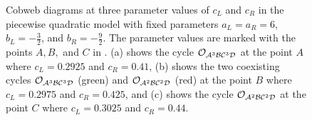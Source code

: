 \begin{figure}
	\centering
	\caption[Cobweb diagrams of the even quadratic model]{
		Cobweb diagrams at three parameter values of $c_L$ and $c_R$ in the piecewise quadratic model with fixed parameters $a_L = a_R = 6$, $b_L = -\frac{3}{2}$, and $b_R = -\frac{9}{2}$.
		The parameter values are marked with the points $A, B,$ and $C$ in .
		(a) shows the cycle $\mathcal{O}_{\mathcal{A}^3\mathcal{B}\mathcal{C}^3\mathcal{D}}$ at the point $A$ where $c_L = 0.2925$ and $c_R = 0.41$,
		(b) shows the two coexisting cycles $\mathcal{O}_{\mathcal{A}^3\mathcal{B}\mathcal{C}^3\mathcal{D}}$ (green) and $\mathcal{O}_{\mathcal{A}^2\mathcal{B}\mathcal{C}^2\mathcal{D}}$ (red) at the point $B$ where $c_L = 0.2975$ and $c_R = 0.425$,
		and (c) shows the cycle $\mathcal{O}_{\mathcal{A}^2\mathcal{B}\mathcal{C}^2\mathcal{D}}$ at the point $C$ where $c_L = 0.3025$ and $c_R = 0.44$.
	}
	\label{fig:setup.quad.even.cobwebs}
\end{figure}

